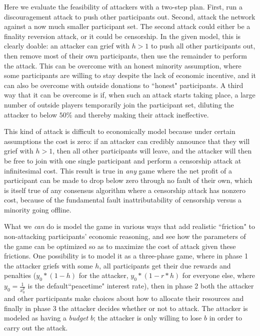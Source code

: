 \documentclass[12pt]{article}
\begin{document}
Here we evaluate the feasibility of attackers with a two-step plan. First, run a discouragement attack to push other participants out. Second, attack the network against a now much smaller participant set. The second attack could either be a finality reversion attack, or it could be censorship. In the given model, this is clearly doable: an attacker can grief with $h > 1$ to push all other participants out, then remove most of their own participants, then use the remainder to perform the attack. This can be overcome with an honest minority assumption, where some participants are willing to stay despite the lack of economic incentive, and it can also be overcome with outside donations to ``honest" participants. A third way that it can be overcome is if, when such an attack starts taking place, a large number of outside players temporarily join the participant set, diluting the attacker to below $50\%$ and thereby making their attack ineffective.

This kind of attack is difficult to economically model because under certain assumptions the cost is zero: if an attacker can credibly announce that they will grief with $h > 1$, then all other participants will leave, and the attacker will then be free to join with one single participant and perform a censorship attack at infinitesimal cost. This result is true in \textit{any} game where the net profit of a participant can be made to drop below zero through no fault of their own, which is itself true of any consensus algorithm where a censorship attack has nonzero cost, because of the fundamental fault inattributability of censorship versus a minority going offline.

What we \textit{can} do is model the game in various ways that add realistic ``friction" to non-attacking participants' economic reasoning, and see how the parameters of the game can be optimized so as to maximize the cost of attack given these frictions. One possibility is to model it as a three-phase game, where in phase 1 the attacker griefs with some $h$, all participants get their due rewards and penalties ($y_0 * (1 - h)$ for the attacker, $y_0 * (1- r * h)$ for everyone else, where $y_0 = \frac{1}{x_0^p}$ is the default``peacetime" interest rate), then in phase 2 both the attacker and other participants make choices about how to allocate their resources and finally in phase 3 the attacker decides whether or not to attack. The attacker is modeled as having a \textit{budget} $b$; the attacker is only willing to lose $b$ in order to carry out the attack.
\end{document}
